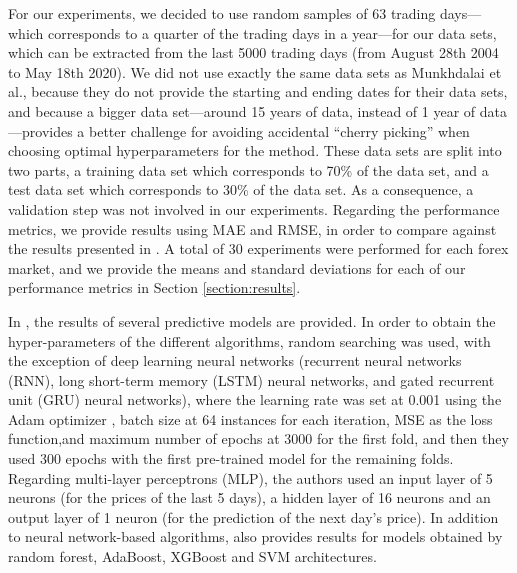 \documentclass{ieeeaccess}
\begin{document}
For our experiments, we decided to use random samples of 63 trading
days---which corresponds to a quarter of the trading days in a
year---for our data sets, which can be extracted from the last 5000
trading days (from August 28th 2004 to May 18th 2020). We did not use
exactly the same data sets as Munkhdalai et al., because they do
not provide the starting and ending dates for their data sets, and
because a bigger data set---around 15 years of data, instead of 1 year
of data---provides a better challenge for avoiding accidental ``cherry
picking'' \cite{morse2010cherry} when choosing optimal hyperparameters
for the method. %
These data sets
are split into two parts, a training data set which corresponds to
70\% of the data set, and a test data set which corresponds to 30\% of
the data set. As a consequence, a validation step was not involved in
our experiments. Regarding the performance metrics, we provide results
using MAE and RMSE, in order to compare against the results presented
in \cite{Munkhdalai2019}. A total
of 30 experiments were performed for each forex market, and we provide
the means and standard deviations for each of our performance metrics
in Section \ref{section:results}.

In \cite{Munkhdalai2019}, the results of several predictive models are
provided. In order to obtain the hyper-parameters of the different
algorithms, random searching was used, with the exception of deep
learning neural networks (recurrent neural networks (RNN), long
short-term memory (LSTM) neural networks, and gated recurrent unit
(GRU) neural networks), where the learning rate was set at 0.001 using
the Adam optimizer \cite{kingma2014adam}, batch size at 64 instances
for each iteration, MSE as the loss function,and maximum number of
epochs at 3000 for the first fold, and then they used 300 epochs with
the first pre-trained model for the remaining folds. Regarding
multi-layer perceptrons (MLP), the authors used an input layer of 5 neurons
(for the prices of the last 5 days), a hidden layer of 16 neurons and
an output layer of 1 neuron (for the prediction of the next day's
price). In addition to neural network-based algorithms,
\cite{kingma2014adam} also provides results for models obtained by
random forest, AdaBoost, XGBoost and SVM
architectures.
\end{document}
